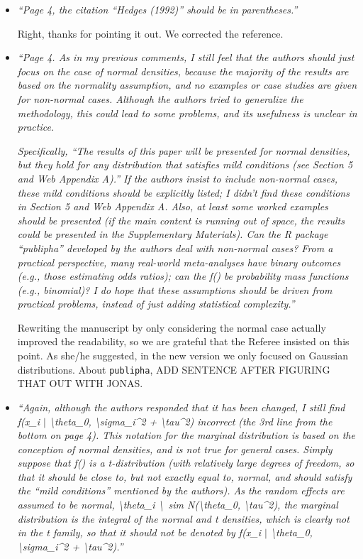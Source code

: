 \documentclass[11pt]{article}
\begin{document}
\begin{itemize}
\item \emph{``Page 4, the citation “Hedges (1992)” should be in parentheses.''}

Right, thanks for pointing it out. We corrected the reference.\\

\item \emph{``Page 4. As in my previous comments, I still feel that the authors should just focus on the case of normal densities, because the majority of the results are based on the normality assumption, and no examples or case studies are given for non-normal cases. Although the authors tried to generalize the methodology, this could lead to some problems, and its usefulness is unclear in practice.}

\emph{Specifically, ``The results of this paper will be presented for normal densities, but they hold for any distribution that satisfies mild conditions (see Section 5 and Web Appendix A).'' If the authors insist to include non-normal cases, these mild conditions should be explicitly listed; I didn't find these conditions in Section 5 and Web Appendix A. Also, at least some worked examples should be presented (if the main content is running out of space, the results could be presented in the Supplementary Materials). Can the R package ``publipha'' developed by the authors deal with non-normal cases? From a practical perspective, many real-world meta-analyses have binary outcomes (e.g., those estimating odds ratios); can the f() be probability mass functions (e.g., binomial)? I do hope that these assumptions should be driven from practical problems, instead of just adding statistical complexity.''}

Rewriting the manuscript by only considering the normal case actually improved the readability, so we are grateful that the Referee insisted on this point. As she/he suggested, in the new version we only focused on Gaussian distributions. About \texttt{publipha}, ADD SENTENCE AFTER FIGURING THAT OUT WITH JONAS.\\

\item \emph{``Again, although the authors responded that it has been changed, I still find f(x\_i $\mid$ \textbackslash theta\_0, \textbackslash sigma\_i\^{}2 + \textbackslash tau\^{}2) incorrect (the 3rd line from the bottom on page 4). This notation for the marginal distribution is based on the conception of normal densities, and is not true for general cases. Simply suppose that f() is a t-distribution (with relatively large degrees of freedom, so that it should be close to, but not exactly equal to, normal, and should satisfy the “mild conditions” mentioned by the authors). As the random effects are assumed to be normal, \textbackslash theta\_i \textbackslash\ sim N(\textbackslash theta\_0, \textbackslash tau\^{}2), the marginal distribution is the integral of the normal and t densities, which is clearly not in the t family, so that it should not be denoted by f(x\_i $\mid$ \textbackslash theta\_0, \textbackslash sigma\_i\^{}2 + \textbackslash tau\^{}2).''}


\end{itemize}
\end{document}
